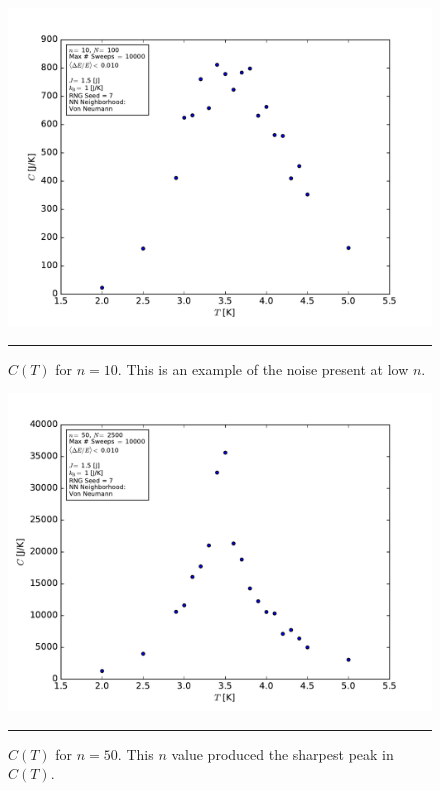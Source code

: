 \documentclass[notitlepage,aps,prd,nofootinbib]{revtex4-1}
\begin{document}
\begin{figure}[!htbc]
  \centering
  \includegraphics[width=.8\textwidth]{../output/plots_for_paper_von_neumann/part_b/CT_for_n10.pdf}
	{\par\nobreak\rule[9pt]{35em}{0.5pt}\vspace{-5mm}}
	\caption{$C\left(T\right)$ for $n=10$. This is an example of the noise present at low $n$.}
	\label{fig:CT_n10}
\end{figure}

\clearpage
\begin{figure}[!htbc]
  \centering
  \includegraphics[width=.75\textwidth]{../output/plots_for_paper_von_neumann/part_b/CT_for_n50.pdf}
	{\par\nobreak\rule[9pt]{35em}{0.5pt}\vspace{-5mm}}
	\caption{$C\left(T\right)$ for $n=50$. This $n$ value produced the sharpest peak in $C\left(T\right)$.}
	\label{fig:CT_n50}
\end{figure}
\end{document}
